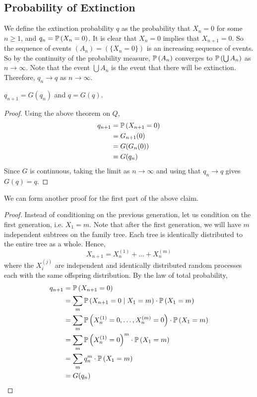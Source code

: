 \documentclass{article}
\begin{document}
\subsection{Probability of Extinction}
We define the extinction probability $q$ as the probability that $X_n = 0$ for some $n \geq 1$, and $q_n = \mathbb{P}\left({X_n = 0}\right)$. It is clear that $X_n = 0$ implies that $X_{n+1} = 0$. So the sequence of events $(A_n) = (\{ X_n = 0 \})$ is an increasing sequence of events. So by the continuity of the probability measure, $\mathbb{P}\left({A_n}\right)$ converges to $\mathbb{P}\left({\bigcup A_n}\right)$ as $n \to \infty$. Note that the event $\bigcup A_n$ is the event that there will be extinction. Therefore, $q_n \to q$ as $n \to \infty$.
\begin{claim}
    $q_{n+1} = G(q_n)$ and $q = G(q)$.
\end{claim}
\begin{proof}
    Using the above theorem on $Q$,
    \begin{align*}
        q_{n+1} & = \mathbb{P}\left({X_{n+1} = 0}\right) \\
                & = G_{n+1}(0)         \\
                & = G(G_n(0))          \\
                & = G(q_n)
    \end{align*}
    Since $G$ is continuous, taking the limit as $n \to \infty$ and using that $q_n \to q$ gives $G(q) = q$.
\end{proof}
\noindent We can form another proof for the first part of the above claim.
\begin{proof}
    Instead of conditioning on the previous generation, let us condition on the first generation, i.e. $X_1 = m$. Note that after the first generation, we will have $m$ independent subtrees on the family tree. Each tree is identically distributed to the entire tree as a whole. Hence,
    \[ X_{n+1} = X_n^{(1)} + \dots + X_n^{(m)} \]
    where the $X_i^{(j)}$ are independent and identically distributed random processes each with the same offspring distribution. By the law of total probability,
    \begin{align*}
        q_{n+1} & = \mathbb{P}\left({X_{n+1} = 0}\right)                                                     \\
                & = \sum_m \mathbb{P}\left({X_{n+1} = 0 \mid X_1 = m}\right) \cdot \mathbb{P}\left({X_1 = m}\right)            \\
                & = \sum_m \mathbb{P}\left({X_n^{(1)} = 0, \dots, X_n^{(m)} = 0}\right) \cdot \mathbb{P}\left({X_1 = m}\right) \\
                & = \sum_m \mathbb{P}\left({X_n^{(1)} = 0}\right)^m \cdot \mathbb{P}\left({X_1 = m}\right)                     \\
                & = \sum_m q_n^m \cdot \mathbb{P}\left({X_1 = m}\right)                                      \\
                & = G(q_n)
    \end{align*}
\end{proof}
\end{document}
